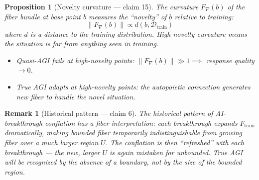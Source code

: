\documentclass[11pt,a4paper]{article}
\newtheorem{proposition}[definition]{Proposition}
\newtheorem{remark}[definition]{Remark}
\begin{document}
\begin{proposition}[Novelty curvature --- claim 15]
\label{prop:novelty}
The curvature $F_\nabla(b)$ of the fiber bundle at base point $b$ measures
the ``novelty'' of $b$ relative to training:
\[
  \|F_\nabla(b)\| \propto d(b, \mathcal{D}_{\text{train}})
\]
where $d$ is a distance to the training distribution. High novelty
curvature means the situation is far from anything seen in training.
\begin{itemize}
  \item Quasi-AGI fails at high-novelty points: $\|F_\nabla(b)\| \gg 1
    \implies$ response quality $\to 0$.
  \item True AGI adapts at high-novelty points: the autopoietic connection
    generates new fiber to handle the novel situation.
\end{itemize}
\end{proposition}

\begin{remark}[Historical pattern --- claim 6]
The historical pattern of AI-breakthrough conflation has a fiber interpretation:
each breakthrough expands $F_{\text{train}}$ dramatically, making bounded
fiber temporarily indistinguishable from growing fiber over a much larger
region $U$. The conflation is then ``refreshed'' with each breakthrough ---
the new, larger $U$ is again mistaken for unbounded. True AGI will be
recognized by the absence of a boundary, not by the size of the bounded region.
\end{remark}
\end{document}
